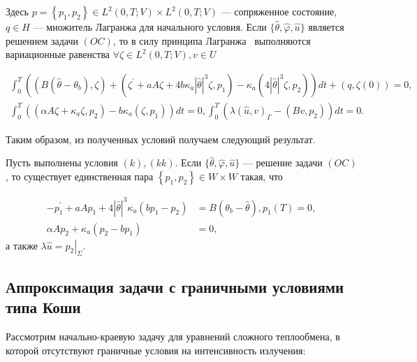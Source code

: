 Здесь $p=\left\{p_{1}, p_{2}\right\} \in L^{2}(0, T; V) \times L^{2}(0, T; V) $
— сопряженное состояние, $q \in H$ — множитель Лагранжа для начального условия.
Если $\{\widehat{\theta}, \widehat{\varphi}, \widehat{u}\}$
является решением задачи $(OC)$, то в силу принципа
Лагранжа~\cite[гл. 2, теорема 1.5]{10} выполняются вариационные равенства
$\forall \zeta \in L^{2}(0, T ; V), v \in U$

\[
    \begin{gathered}
        \int_{0}^{T}\left(\left(B\left(\widehat{\theta}-\theta_{b}\right),
        \zeta\right)+\left(\zeta^{\prime}
        +a A \zeta+4 b \kappa_{a}|\widehat{\theta}|^{3} \zeta, p_{1}\right)
        -\kappa_{a}\left(4|\widehat{\theta}|^{3} \zeta,
        p_{2}\right)\right) d t+(q, \zeta(0))=0, \\
        \int_{0}^{T}\left(\left(\alpha A \zeta
        +\kappa_{a} \zeta, p_{2}\right)
        -b \kappa_{a}\left(\zeta, p_{1}\right)\right) d t=0,
        \int_{0}^{T}\left(\lambda(\widehat{u}, v)_{\Gamma}
        -\left(B v, p_{2}\right)\right) d t=0.
    \end{gathered}
\]

Таким образом, из полученных условий получаем следующий результат.

\begin{theorem}
    \label{th:2_3:2}
    Пусть выполнены условия $(k), (kk)$.
    Если $\{\widehat{\theta}, \widehat{\varphi}, \widehat{u}\}$ — решение задачи $(OC)$,
    то существует единственная пара $\left\{p_ {1}, p_{2}\right\} \in W \times W$ такая, что

    \begin{equation}
        \label{eq:2_3:15}
        \begin{aligned}
            -p_{1}^{\prime}+a A p_{1}+4|\widehat{\theta}|^{3} \kappa_{a}\left(b p_{1}
            -p_{2}\right)&=B\left(\theta_{b}-\widehat{\theta}\right),
            p_{1}(T)=0, \\
            \alpha A p_{2}+\kappa_{a}\left(p_{2}-b p_{1}\right)&=0,
        \end{aligned}
    \end{equation}
    а также $\lambda \widehat{u}=\left.p_{2}\right|_{\Sigma}$.
\end{theorem}

\subsection{Аппроксимация задачи с граничными условиями типа Коши}
\label{subsec:ch2/sec3/approximation}
Рассмотрим начально-краевую задачу для уравнений сложного
теплообмена, в которой отсутствуют граничные условия на интенсивность излучения:

